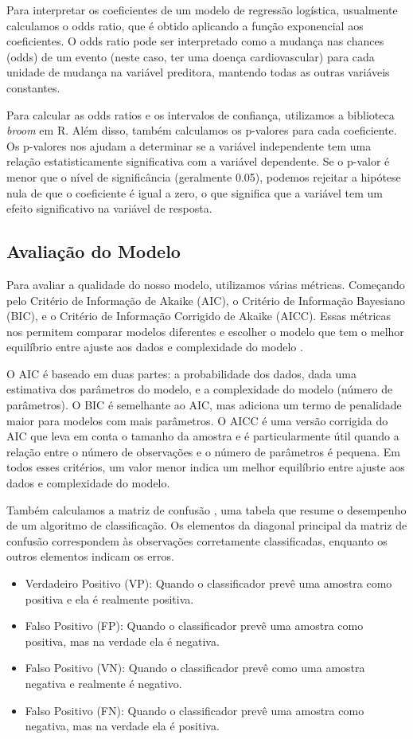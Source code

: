 \documentclass[article,11pt,a4paper,brazil]{abntex2}
\begin{document}
	Para interpretar os coeficientes de um modelo de regressão logística, usualmente calculamos o odds ratio, que é obtido aplicando a função exponencial aos coeficientes. O odds ratio pode ser interpretado como a mudança nas chances (odds) de um evento (neste caso, ter uma doença cardiovascular) para cada unidade de mudança na variável preditora, mantendo todas as outras variáveis constantes.
	
	Para calcular as odds ratios e os intervalos de confiança, utilizamos a biblioteca \textit{broom} em R. Além disso, também calculamos os p-valores para cada coeficiente. Os p-valores nos ajudam a determinar se a variável independente tem uma relação estatisticamente significativa com a variável dependente. Se o p-valor é menor que o nível de significância (geralmente 0.05), podemos rejeitar a hipótese nula de que o coeficiente é igual a zero, o que significa que a variável tem um efeito significativo na variável de resposta.
	
	\subsection{Avaliação do Modelo}
	Para avaliar a qualidade do nosso modelo, utilizamos várias métricas. Começando pelo Critério de Informação de Akaike (AIC), o Critério de Informação Bayesiano (BIC), e o Critério de Informação Corrigido de Akaike (AICC). Essas métricas nos permitem comparar modelos diferentes e escolher o modelo que tem o melhor equilíbrio entre ajuste aos dados e complexidade do modelo \cite{brewer2016relative}.
	
	 O AIC é baseado em duas partes: a probabilidade dos dados, dada uma estimativa dos parâmetros do modelo, e a complexidade do modelo (número de parâmetros). O BIC é semelhante ao AIC, mas adiciona um termo de penalidade maior para modelos com mais parâmetros. O AICC é uma versão corrigida do AIC que leva em conta o tamanho da amostra e é particularmente útil quando a relação entre o número de observações e o número de parâmetros é pequena. Em todos esses critérios, um valor menor indica um melhor equilíbrio entre ajuste aos dados e complexidade do modelo. 
	
	Também calculamos a matriz de confusão \cite{wiki-confusion-matrix}, uma tabela que resume o desempenho de um algoritmo de classificação. Os elementos da diagonal principal da matriz de confusão correspondem às observações corretamente classificadas, enquanto os outros elementos indicam os erros. 
	
	\begin{itemize}
	\item Verdadeiro Positivo (VP): Quando o classificador prevê uma amostra como positiva e ela é realmente positiva.
	\item  Falso Positivo (FP): Quando o classificador prevê uma amostra como positiva, mas na verdade ela é negativa.
	\item  Falso Positivo (VN): Quando o classificador prevê como uma amostra negativa e realmente é negativo.
	\item  Falso Positivo (FN): Quando o classificador prevê uma amostra como negativa, mas na verdade ela é positiva.
	\end{itemize}
	
\end{document}
